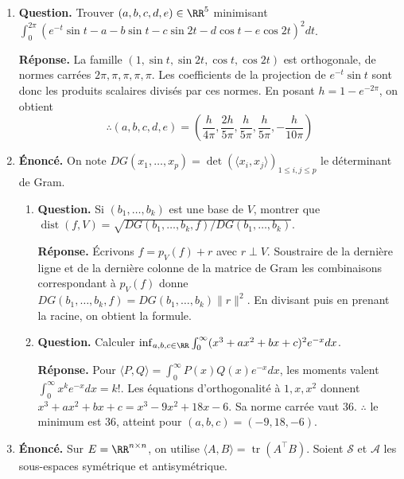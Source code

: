 \documentclass[12pt, a4paper]{article}
\begin{document}
\begin{enumerate}[label=8.\arabic*., start=70]
  \item \begin{minipage}[t]{\linewidth}\raggedright
\textbf{Question.} Trouver $(a,b,c,d,e)\in\RR^5$ minimisant $\int_0^{2\pi}(e^{-t}\sin t-a-b\sin t-c\sin2t-d\cos t-e\cos2t)^2dt$.
\par\smallskip
\textbf{Réponse.} La famille $(1,\sin t,\sin2t,\cos t,\cos2t)$ est orthogonale, de normes carrées $2\pi,\pi,\pi,\pi,\pi$.
    Les coefficients de la projection de $e^{-t}\sin t$ sont donc les produits scalaires divisés par ces normes.
    En posant $h=1-e^{-2\pi}$, on obtient
    \[
      \therefore(a,b,c,d,e)=\left(\frac{h}{4\pi},\frac{2h}{5\pi},\frac{h}{5\pi},\frac{h}{5\pi},-\frac{h}{10\pi}\right)
    \]
\end{minipage}

  \item \begin{minipage}[t]{\linewidth}\raggedright
\textbf{Énoncé.} On note $DG(x_1,\ldots,x_p)=\det(\langle x_i,x_j\rangle)_{1\leq i,j\leq p}$ le déterminant de Gram.

\begin{enumerate}[\arabic*.]
        \item \textbf{Question.} Si $(b_1,\ldots,b_k)$ est une base de $V$, montrer que $\operatorname{dist}(f,V)=\sqrt{DG(b_1,\ldots,b_k,f)/DG(b_1,\ldots,b_k)}$.
\par\smallskip
\textbf{Réponse.} Écrivons $f=p_V(f)+r$ avec $r\perp V$.
        Soustraire de la dernière ligne et de la dernière colonne de la matrice de Gram les combinaisons correspondant à $p_V(f)$ donne
        $DG(b_1,\ldots,b_k,f)=DG(b_1,\ldots,b_k)\|r\|^2$.
        En divisant puis en prenant la racine, on obtient la formule.

  \item \textbf{Question.} Calculer $\inf_{a,b,c\in\RR}\int_0^\infty(x^3+ax^2+bx+c)^2e^{-x}dx$.
\par\smallskip
\textbf{Réponse.} Pour $\langle P,Q\rangle=\int_0^\infty P(x)Q(x)e^{-x}dx$, les moments valent $\int_0^\infty x^ke^{-x}dx=k!$.
        Les équations d'orthogonalité à $1,x,x^2$ donnent
        $x^3+ax^2+bx+c=x^3-9x^2+18x-6$.
        Sa norme carrée vaut $36$.
        $\therefore$ le minimum est $36$, atteint pour $(a,b,c)=(-9,18,-6)$.

\end{enumerate}
\end{minipage}

  \item \begin{minipage}[t]{\linewidth}\raggedright
\textbf{Énoncé.} Sur $E=\RR^{n\times n}$, on utilise $\langle A,B\rangle=\operatorname{tr}(A^\top B)$. Soient $\mathcal S$ et $\mathcal A$ les sous-espaces symétrique et antisymétrique.


\end{minipage}
\end{enumerate}
\end{document}
